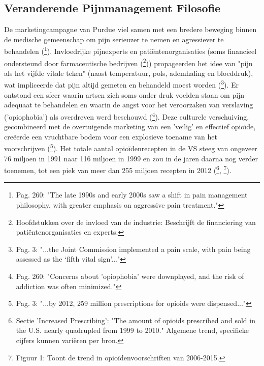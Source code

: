 \documentclass[11pt, a4paper]{report} %
\begin{document}
\subsection{Veranderende Pijnmanagement Filosofie}
De marketingcampagne van Purdue viel samen met een bredere beweging binnen de medische gemeenschap om pijn serieuzer te nemen en agressiever te behandelen (\cite{Cicero2017Review}\footnote{Pag. 260: "The late 1990s and early 2000s saw a shift in pain management philosophy, with greater emphasis on aggressive pain treatment."}). Invloedrijke pijnexperts en patiëntenorganisaties (soms financieel ondersteund door farmaceutische bedrijven (\cite{Macy2018Dopesick}\footnote{Hoofdstukken over de invloed van de industrie: Beschrijft de financiering van patiëntenorganisaties en experts.})) propageerden het idee van "pijn als het vijfde vitale teken" (naast temperatuur, pols, ademhaling en bloeddruk), wat impliceerde dat pijn altijd gemeten en behandeld moest worden (\cite{Maclean2020EconomicStudiesOpioid}\footnote{Pag. 3: "...the Joint Commission implemented a pain scale, with pain being assessed as the ‘fifth vital sign’..."}). Er ontstond een sfeer waarin artsen zich soms onder druk voelden staan om pijn adequaat te behandelen en waarin de angst voor het veroorzaken van verslaving ('opiophobia') als overdreven werd beschouwd (\cite{Cicero2017Review}\footnote{Pag. 260: "Concerns about 'opiophobia' were downplayed, and the risk of addiction was often minimized."}). Deze culturele verschuiving, gecombineerd met de overtuigende marketing van een 'veilig' en effectief opioïde, creëerde een vruchtbare bodem voor een explosieve toename van het voorschrijven (\cite{Maclean2020EconomicStudiesOpioid}\footnote{Pag. 3: "...by 2012, 259 million prescriptions for opioids were dispensed..."}). Het totale aantal opioïdenrecepten in de VS steeg van ongeveer 76 miljoen in 1991 naar 116 miljoen in 1999 en zou in de jaren daarna nog verder toenemen, tot een piek van meer dan 255 miljoen recepten in 2012 (\cite{CDCUnderstandingEpidemic}\footnote{Sectie 'Increased Prescribing': "The amount of opioids prescribed and sold in the U.S. nearly quadrupled from 1999 to 2010." Algemene trend, specifieke cijfers kunnen variëren per bron.}, \cite{CDCVitalSigns2017}\footnote{Figuur 1: Toont de trend in opioïdenvoorschriften van 2006-2015.}).
\end{document}
